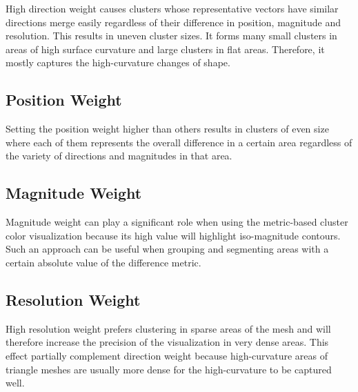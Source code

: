 High direction weight causes clusters whose representative vectors have similar directions merge easily regardless of their difference in position, magnitude and resolution. This results in uneven cluster sizes. It forms many small clusters in areas of high surface curvature and large clusters in flat areas. Therefore, it mostly captures the high-curvature changes of shape.
\subsection{Position Weight}

Setting the position weight higher than others results in clusters of even size where each of them represents the overall difference in a certain area regardless of the variety of directions and magnitudes in that area.
\subsection{Magnitude Weight}

Magnitude weight can play a significant role when using the metric-based cluster color visualization because its high value will highlight iso-magnitude contours. Such an approach can be useful when grouping and segmenting areas with a certain absolute value of the difference metric.
\subsection{Resolution Weight}

High resolution weight prefers clustering in sparse areas of the mesh and will therefore increase the precision of the visualization in very dense areas. This effect partially complement direction weight because high-curvature areas of triangle meshes are usually more dense for the high-curvature to be captured well.